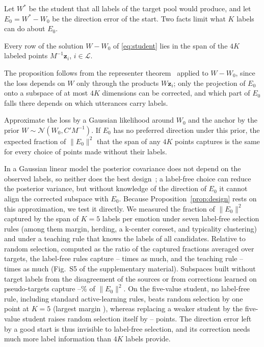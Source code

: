 Let $W^{*}$ be the student that all labels of the target pool would produce, and let $E_0 = W^{*} - W_0$ be the direction error of the start.
Two facts limit what $K$ labels can do about $E_0$.

\begin{proposition}[Span]
\label{prop:span}
Every row of the solution $W - W_0$ of \eqref{eq:student} lies in the span of the $4K$ labeled points $M^{-1}\mathbf{z}_i$, $i \in \mathcal{L}$.
\end{proposition}

The proposition follows from the representer theorem~\cite{kimeldorf1971results,scholkopf2001generalized} applied to $W - W_0$, since the loss depends on $W$ only through the products $W\mathbf{z}_i$; only the projection of $E_0$ onto a subspace of at most $4K$ dimensions can be corrected, and which part of $E_0$ falls there depends on which utterances carry labels.

\begin{proposition}
\label{prop:design}
Approximate the loss by a Gaussian likelihood around $W_0$ and the anchor by the prior $W \sim \mathcal{N}(W_0, C' M^{-1})$.
If $E_0$ has no preferred direction under this prior, the expected fraction of $\|E_0\|^2$ that the span of any $4K$ points captures is the same for every choice of points made without their labels.
\end{proposition}

In a Gaussian linear model the posterior covariance does not depend on the observed labels, so neither does the best design~\cite{chaloner1984optimal,chaloner1995bayesian}; a label-free choice can reduce the posterior variance, but without knowledge of the direction of $E_0$ it cannot align the corrected subspace with $E_0$.
Because Proposition~\ref{prop:design} rests on this approximation, we test it directly.
We measured the fraction of $\|E_0\|^2$ captured by the span of $K=5$ labels per emotion under seven label-free selection rules (among them margin, herding, a k-center coreset, and typicality clustering) and under a teaching rule that knows the labels of all candidates.
Relative to random selection, computed as the ratio of the captured fractions averaged over targets, the label-free rules capture -- times as much, and the teaching rule -- times as much (Fig.~S5 of the supplementary material).
Subspaces built without target labels from the disagreement of the sources or from corrections learned on pseudo-targets capture --\% of $\|E_0\|^2$.
On the five-value student, no label-free rule, including standard active-learning rules, beats random selection by one point at $K=5$ (largest margin ), whereas replacing a weaker student by the five-value student raises random selection itself by -- points.
The direction error left by a good start is thus invisible to label-free selection, and its correction needs much more label information than $4K$ labels provide.



